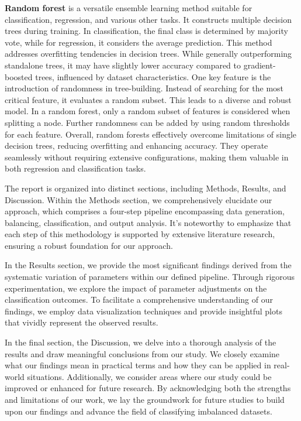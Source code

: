 \textbf{Random forest} is a versatile ensemble learning method suitable for classification, regression, and various other tasks. It constructs multiple decision trees during training. In classification, the final class is determined by majority vote, while for regression, it considers the average prediction. This method addresses overfitting tendencies in decision trees. While generally outperforming standalone trees, it may have slightly lower accuracy compared to gradient-boosted trees, influenced by dataset characteristics.
One key feature is the introduction of randomness in tree-building. Instead of searching for the most critical feature, it evaluates a random subset. This leads to a diverse and robust model. In a random forest, only a random subset of features is considered when splitting a node. Further randomness can be added by using random thresholds for each feature.
Overall, random forests effectively overcome limitations of single decision trees, reducing overfitting and enhancing accuracy. They operate seamlessly without requiring extensive configurations, making them valuable in both regression and classification tasks.

The report is organized into distinct sections, including Methods, Results, and Discussion. Within the Methods section, we comprehensively elucidate our approach, which comprises a four-step pipeline encompassing data generation, balancing, classification, and output analysis. It’s noteworthy to emphasize that each step of this methodology is supported by extensive literature research, ensuring a robust foundation for our approach.

In the Results section, we provide the most significant findings derived from the systematic variation of parameters within our defined pipeline. Through rigorous experimentation, we explore the impact of parameter adjustments on the classification outcomes. To facilitate a comprehensive understanding of our findings, we employ data visualization techniques and provide insightful plots that vividly represent the observed results.

In the final section, the Discussion, we delve into a thorough analysis of the results and draw meaningful conclusions from our study. We closely examine what our findings mean in practical terms and how they can be applied in real-world situations. Additionally, we consider areas where our study could be improved or enhanced for future research. By acknowledging both the strengths and limitations of our work, we lay the groundwork for future studies to build upon our findings and advance the field of classifying imbalanced datasets. 



 
